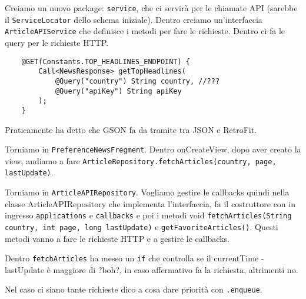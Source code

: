 \par Creiamo un nuovo package: \texttt{service}, che ci servirà per le chiamate API (sarebbe il \texttt{ServiceLocator} dello schema iniziale). Dentro creiamo un'interfaccia \texttt{ArticleAPIService} che definisce i metodi per fare le richieste. Dentro ci fa le query per le richieste HTTP.
\begin{verbatim}
    @GET(Constants.TOP_HEADLINES_ENDPOINT) {
        Call<NewsResponse> getTopHeadlines(
            @Query("country") String country, //???
            @Query("apiKey") String apiKey
        );
    }
\end{verbatim}
\par Praticamente ha detto che GSON fa da tramite tra JSON e RetroFit.
\par Torniamo in \texttt{PreferenceNewsFregment}. Dentro onCreateView, dopo aver creato la view, andiamo a fare \texttt{ArticleRepository.fetchArticles(country, page, lastUpdate)}.
\par Torniamo in \texttt{ArticleAPIRepository}. Vogliamo gestire le callbacks quindi nella classe ArticleAPIRepository che implementa l'interfaccia, fa il costruttore con in ingresso \texttt{applications} e \texttt{callbacks} e poi i metodi void \texttt{fetchArticles(String country, int page, long lastUpdate)} e \texttt{getFavoriteArticles()}. Questi metodi vanno a fare le richieste HTTP e a gestire le callbacks. %
\par Dentro \texttt{fetchArticles} ha messo un \texttt{if} che controlla se il currentTime - lastUpdate è maggiore di ?boh?, in caso affermativo fa la richiesta, altrimenti no.
\par Nel caso ci siano tante richieste dico a cosa dare priorità con \texttt{.enqueue}.

